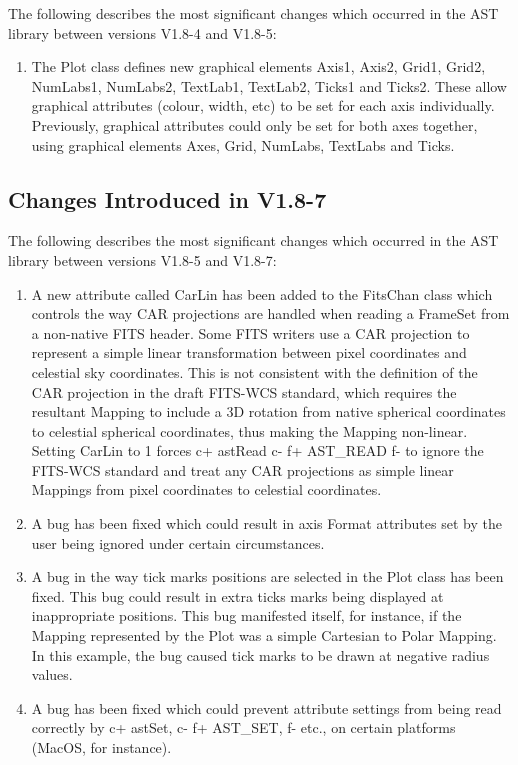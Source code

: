 \documentclass[twoside,11pt]{starlink}
\begin{document}
The following describes the most significant changes which
occurred in the AST library between versions V1.8-4 and V1.8-5:

\begin{enumerate}

\item The Plot class defines new graphical elements Axis1, Axis2,
Grid1, Grid2, NumLabs1, NumLabs2, TextLab1, TextLab2, Ticks1 and Ticks2.
These allow graphical attributes (colour, width, etc) to be set for each
axis individually. Previously, graphical attributes could only be set for
both axes together, using graphical elements Axes, Grid, NumLabs,
TextLabs and Ticks.

\end{enumerate}


\subsection{Changes Introduced in V1.8-7}

The following describes the most significant changes which
occurred in the AST library between versions V1.8-5 and V1.8-7:

\begin{enumerate}

\item A new attribute called CarLin has been added to the FitsChan class
which controls the way CAR projections are handled when reading a
FrameSet from a non-native FITS header. Some FITS writers use a CAR
projection to represent a simple linear transformation between pixel
coordinates and celestial sky coordinates. This is not consistent with
the definition of the CAR projection in the draft FITS-WCS standard, which
requires the resultant Mapping to include a 3D rotation from native
spherical coordinates to celestial spherical coordinates, thus making the
Mapping non-linear. Setting CarLin to 1 forces
c+
astRead
c-
f+
AST\_READ
f-
to ignore the FITS-WCS standard and treat any CAR projections as simple
linear Mappings from pixel coordinates to celestial coordinates.

\item A bug has been fixed which could result in axis Format attributes
set by the user being ignored under certain circumstances.

\item A bug in the way tick marks positions are selected in the Plot class
has been fixed. This bug could result in extra ticks marks being displayed at
inappropriate positions. This bug manifested itself, for instance, if the
Mapping represented by the Plot was a simple Cartesian to Polar Mapping.
In this example, the bug caused tick marks to be drawn at negative radius
values.

\item A bug has been fixed which could prevent attribute settings from
being read correctly by
c+
astSet,
c-
f+
AST\_SET,
f-
etc., on certain platforms (MacOS, for instance).

\end{enumerate}
\end{document}
